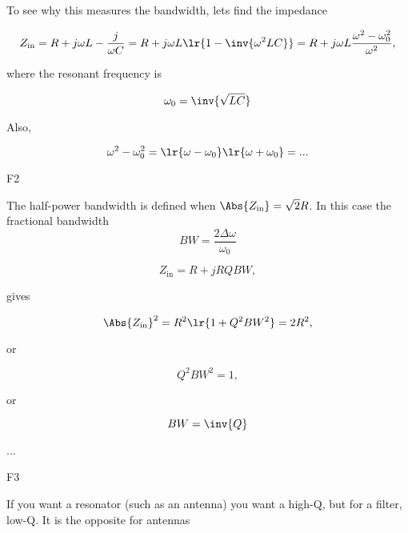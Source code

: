 To see why this measures the bandwidth, lets find the impedance

\begin{dmath}\label{eqn:uwavesDeck8ResonatorQfactorCore:160}
Z_{\textrm{in}}
= R + j \omega L - \frac{j}{\omega C}
= R + j \omega L \lr{ 1 - \inv{\omega^2 L C} }
= R + j \omega L \frac{\omega^2 - \omega_0^2}{\omega^2},
\end{dmath}

where the resonant frequency is

\begin{dmath}\label{eqn:uwavesDeck8ResonatorQfactorCore:180}
\omega_0 = \inv{\sqrt{LC}}
\end{dmath}

Also,

\begin{dmath}\label{eqn:uwavesDeck8ResonatorQfactorCore:200}
\omega^2 - \omega_0^2 = \lr{ \omega - \omega_0 }\lr{ \omega + \omega_0 }
=
...
\end{dmath}

F2

The half-power bandwidth is defined when \( \Abs{Z_{\textrm{in}}} = \sqrt{2} R \).  In this case the fractional bandwidth
\begin{dmath}\label{eqn:uwavesDeck8ResonatorQfactorCore:220}
BW = \frac{2 \Delta \omega}{\omega_0}
\end{dmath}

\begin{dmath}\label{eqn:uwavesDeck8ResonatorQfactorCore:240}
Z_{\textrm{in}} = R + j R Q BW,
\end{dmath}

gives

\begin{dmath}\label{eqn:uwavesDeck8ResonatorQfactorCore:260}
\Abs{Z_{\textrm{in}}}^2 = R^2\lr{ 1 + Q^2 BW^2 } = 2 R^2,
\end{dmath}

or

\begin{dmath}\label{eqn:uwavesDeck8ResonatorQfactorCore:280}
Q^2 BW^2 = 1,
\end{dmath}

or

\begin{dmath}\label{eqn:uwavesDeck8ResonatorQfactorCore:300}
BW = \inv{Q}
\end{dmath}

...

F3

If you want a resonator (such as an antenna) you want a high-Q, but for a filter, low-Q.  It is the opposite for antennas

